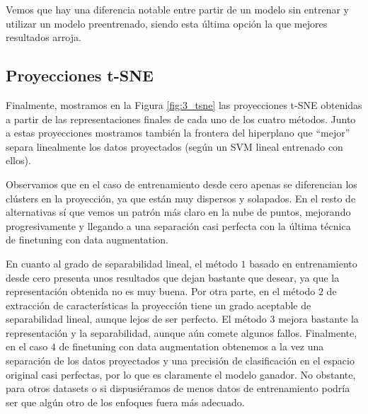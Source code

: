 \documentclass[11pt]{article}
\begin{document}
Vemos que hay una diferencia notable entre partir de un modelo sin entrenar y utilizar un modelo preentrenado, siendo esta última opción la que mejores resultados arroja.

\subsection*{Proyecciones t-SNE}

Finalmente, mostramos en la Figura \ref{fig:3_tsne} las proyecciones t-SNE obtenidas a partir de las representaciones finales de cada uno de los cuatro métodos. Junto a estas proyecciones mostramos también la frontera del hiperplano que ``mejor'' separa linealmente los datos proyectados (según un SVM lineal entrenado con ellos).

Observamos que en el caso de entrenamiento desde cero apenas se diferencian los clústers en la proyección, ya que están muy dispersos y solapados. En el resto de alternativas sí que vemos un patrón más claro en la nube de puntos, mejorando progresivamente y llegando a una separación casi perfecta con la última técnica de finetuning con data augmentation.

En cuanto al grado de separabilidad lineal, el método $1$ basado en entrenamiento desde cero presenta unos resultados que dejan bastante que desear, ya que la representación obtenida no es muy buena. Por otra parte, en el método $2$ de extracción de características la proyección tiene un grado aceptable de separabilidad lineal, aunque lejos de ser perfecto. El método $3$ mejora bastante la representación y la separabilidad, aunque aún comete algunos fallos. Finalmente, en el caso $4$ de finetuning con data augmentation obtenemos a la vez una separación de los datos proyectados y una precisión de clasificación en el espacio original casi perfectas, por lo que es claramente el modelo ganador. No obstante, para otros datasets o si dispusiéramos de menos datos de entrenamiento podría ser que algún otro de los enfoques fuera más adecuado.
\end{document}
